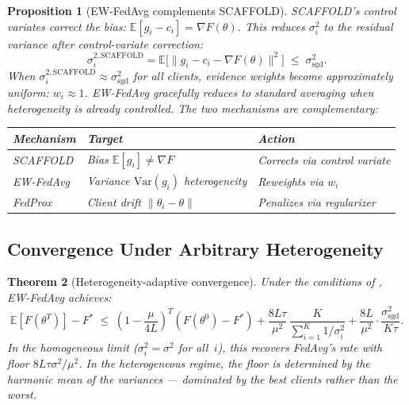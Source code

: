 \documentclass[11pt,a4paper]{article}
\newtheorem{theorem}{Theorem}[section]
\newtheorem{proposition}[theorem]{Proposition}
\newcommand{\E}{\mathbb{E}}
\newcommand{\norm}[1]{\|#1\|}
\begin{document}
\begin{proposition}[EW-FedAvg complements SCAFFOLD]\label{prop:scaffold}
SCAFFOLD's control variates correct the bias: $\E[g_i - c_i] = \nabla F(\theta)$.
This reduces $\sigma_i^2$ to the residual variance after control-variate
correction:
\begin{equation}
  \sigma_i^{2,\text{SCAFFOLD}} = \E\bigl[\norm{g_i - c_i - \nabla F(\theta)}^2\bigr]
  \;\leq\; \sigma_{\text{sgd}}^2.
\end{equation}
When $\sigma_i^{2,\text{SCAFFOLD}} \approx \sigma_{\text{sgd}}^2$ for all
clients, evidence weights become approximately uniform: $w_i \approx 1$.
EW-FedAvg gracefully reduces to standard averaging when heterogeneity is
already controlled. The two mechanisms are complementary:
\begin{center}
\begin{tabular}{lll}
\toprule
\textbf{Mechanism} & \textbf{Target} & \textbf{Action} \\
\midrule
SCAFFOLD & Bias $\E[g_i] \neq \nabla F$ & Corrects via control variate \\
EW-FedAvg & Variance $\text{Var}(g_i)$ heterogeneity & Reweights via $w_i$ \\
FedProx & Client drift $\norm{\theta_i - \theta}$ & Penalizes via regularizer \\
\bottomrule
\end{tabular}
\end{center}
\end{proposition}

\subsection{Convergence Under Arbitrary Heterogeneity}

\begin{theorem}[Heterogeneity-adaptive convergence]\label{thm:noniid-conv}
Under the conditions of , EW-FedAvg achieves:
\begin{equation}
  \E[F(\theta^T)] - F^* \;\leq\;
  \left(1 - \frac{\mu}{4L}\right)^T (F(\theta^0) - F^*)
  + \frac{8L\tau}{\mu^2}\,\frac{K}{\sum_{i=1}^K 1/\sigma_i^2}
  + \frac{8L}{\mu^2} \cdot \frac{\sigma_{\text{sgd}}^2}{K\tau}.
\end{equation}
In the homogeneous limit ($\sigma_i^2 = \sigma^2$ for all~$i$), this
recovers FedAvg's rate with floor $8L\tau\sigma^2/\mu^2$. In the
heterogeneous regime, the floor is determined by the \emph{harmonic mean}
of the variances --- dominated by the best clients rather than the worst.
\end{theorem}
\end{document}
